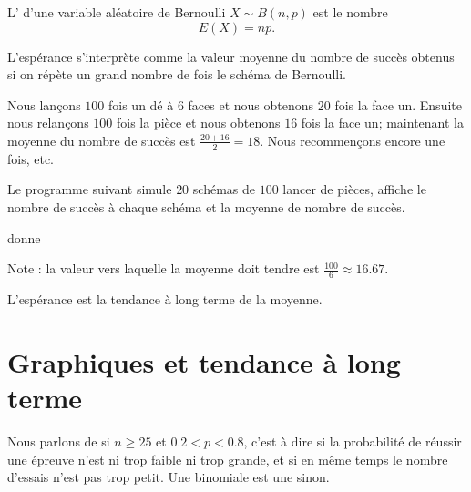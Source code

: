 \begin{definition}
    L' d'une variable aléatoire de Bernoulli \( X\sim B(n,p)\) est le nombre
    \begin{equation}
        E(X)=np.
    \end{equation}
\end{definition}
\begin{Aretenir}
    L'espérance s'interprète comme la valeur moyenne du nombre de succès obtenus si on répète un grand nombre de fois le schéma de Bernoulli.
\end{Aretenir}

\begin{example}
    Nous lançons \( 100\) fois un dé à \( 6\) faces et nous obtenons \( 20\) fois la face un. Ensuite nous relançons \( 100\) fois la pièce et nous obtenons \( 16\) fois la face un; maintenant la moyenne du nombre de succès est \( \frac{ 20+16 }{ 2 }=18\). Nous recommençons encore une fois, etc.

Le programme suivant simule \( 20\) schémas de \( 100\) lancer de pièces, affiche le nombre de succès à chaque schéma et la moyenne de nombre de succès.

donne

Note : la valeur vers laquelle la moyenne doit tendre est \( \frac{ 100 }{ 6 }\approx 16.67\).

\end{example}

L'espérance est la tendance à long terme de la moyenne.

\section{Graphiques et tendance à long terme}

Nous parlons de  si \( n\geq 25\) et \( 0.2<p<0.8\), c'est à dire si la probabilité de réussir une épreuve n'est ni trop faible ni trop grande, et si en même temps le nombre d'essais n'est pas trop petit. Une binomiale est une  sinon.

